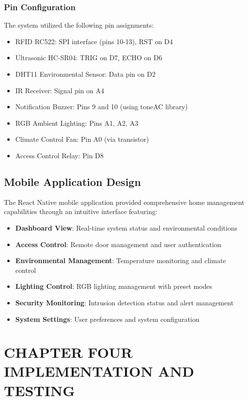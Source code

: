 \documentclass[12pt,a4paper]{report}
\begin{document}
\subsection{Pin Configuration}
\noindent The system utilized the following pin assignments:
\begin{itemize}
\item RFID RC522: SPI interface (pins 10-13), RST on D4
\item Ultrasonic HC-SR04: TRIG on D7, ECHO on D6
\item DHT11 Environmental Sensor: Data pin on D2
\item IR Receiver: Signal pin on A4
\item Notification Buzzer: Pins 9 and 10 (using toneAC library)
\item RGB Ambient Lighting: Pins A1, A2, A3
\item Climate Control Fan: Pin A0 (via transistor)
\item Access Control Relay: Pin D8
\end{itemize}

\section{Mobile Application Design}

\noindent The React Native mobile application provided comprehensive home management capabilities through an intuitive interface featuring:

\begin{itemize}
\item \textbf{Dashboard View}: Real-time system status and environmental conditions
\item \textbf{Access Control}: Remote door management and user authentication
\item \textbf{Environmental Management}: Temperature monitoring and climate control
\item \textbf{Lighting Control}: RGB lighting management with preset modes
\item \textbf{Security Monitoring}: Intrusion detection status and alert management
\item \textbf{System Settings}: User preferences and system configuration
\end{itemize}

\chapter[CHAPTER FOUR IMPLEMENTATION AND TESTING]{CHAPTER FOUR\\IMPLEMENTATION AND TESTING}
\end{document}
